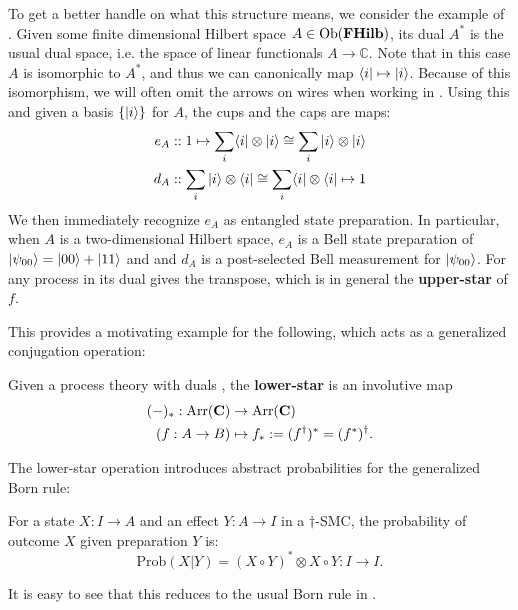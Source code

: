 \begin{example}
\label{ex:bellduals}
To get a better handle on what this structure means, we consider the example of . Given some finite dimensional Hilbert space $A\in\mbox{Ob}(\mathbf{FHilb})$, its dual $A^*$ is the usual dual space, i.e. the space of linear functionals $A\to \mathbb{C}$. Note that in this case $A$ is isomorphic to $A^*$, and thus we can canonically map $\langle i |\mapsto| i \rangle$. Because of this isomorphism, we will often omit the arrows on wires when working in . Using this and given a basis $\{ | i \rangle \}$ for $A$, the cups and the caps are maps:
\begin{align}
e_A &:: 1\mapsto \sum_i\langle i |\otimes| i \rangle\cong\sum_i| i \rangle\otimes| i \rangle
\\
d_A &:: \sum_i| i \rangle\otimes\langle i |\cong\sum_i\langle i |\otimes\langle i | \mapsto 1
\end{align}
We then immediately recognize $e_A$ as entangled state preparation. In particular, when $A$ is a two-dimensional Hilbert space, $e_A$ is a Bell state preparation of $| \psi_{00} \rangle=| 00 \rangle+| 11 \rangle$ and  and $d_A$ is a post-selected Bell measurement for $| \psi_{00} \rangle$. For any process in  its dual gives the transpose, which is in general the \textbf{upper-star} of $f$.
\end{example}

This provides a motivating example for the following, which acts as a generalized conjugation operation:

\begin{defn}
Given a process theory with duals , the \textbf{lower-star} is an involutive map 
\begin{align*}
(-)_*:\mbox{Arr}(\mathbf{C})&\to\mbox{Arr}(\mathbf{C}) \\
\left(f:A\to B\right) &\mapsto f_*:=(f^\dagger)^*=(f^*)^\dagger.
\end{align*}
\end{defn}

The lower-star operation introduces abstract probabilities for the generalized Born rule:
\begin{defn}
\label{def:bornrule}
For a state $X:I\to A$ and an effect $Y:A\to I$ in a $\dagger$-SMC, the probability of outcome $X$ given preparation $Y$ is:
\begin{equation}
\mbox{Prob}(X|Y) = (X\circ Y)^*\otimes X\circ Y:I\to I.
\end{equation}
\end{defn}
\noindent It is easy to see that this reduces to the usual Born rule in .

